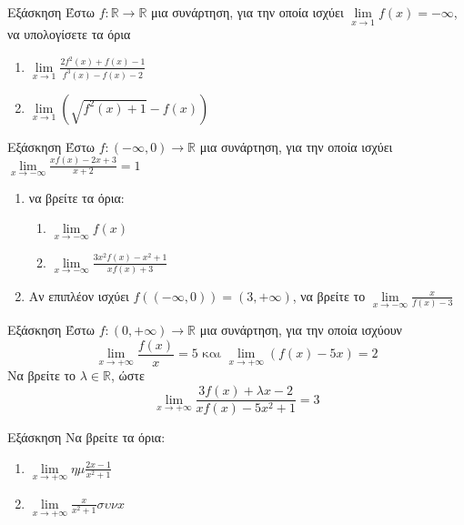 \documentclass[greek]{beamer}
\begin{document}
\begin{frame}{Εξάσκηση}
      Έστω $f:\mathbb{R}\to\mathbb{R}$ μια συνάρτηση, για την οποία ισχύει $\lim\limits_{x \to 1}{ f(x)  }=-\infty$, να υπολογίσετε τα όρια
      \begin{enumerate}
            \item $\lim\limits_{x \to 1}{ \frac{2f^2(x)+f(x)-1}{f^3(x)-f(x)-2} }$ \pause
            \item $\lim\limits_{x \to 1}{ \left( \sqrt{f^2(x)+1}-f(x) \right)  }$
      \end{enumerate}
\end{frame}

\begin{frame}{Εξάσκηση}
      Έστω $f:(-\infty,0)\to\mathbb{R}$ μια συνάρτηση, για την οποία ισχύει $\lim\limits_{x \to -\infty}{ \frac{xf(x)-2x+3}{x+2}  }=1$
      \begin{enumerate}
            \item να βρείτε τα όρια:
                  \begin{enumerate}
                        \item $\lim\limits_{x \to -\infty}{ f(x) }$ \pause
                        \item $\lim\limits_{x \to -\infty}{ \frac{3x^2f(x)-x^2+1}{xf(x)+3}  }$
                  \end{enumerate}
            \item Αν επιπλέον ισχύει $f\left( (-\infty,0) \right)=(3,+\infty) $, να βρείτε το $\lim\limits_{x \to -\infty}{ \frac{x}{f(x)-3} }$
      \end{enumerate}
\end{frame}

\begin{frame}{Εξάσκηση}
      Έστω $f:(0,+\infty)\to\mathbb{R}$ μια συνάρτηση, για την οποία ισχύουν
      $$\lim\limits_{x \to +\infty}{ \frac{f(x)}{x} }=5 \text{ και } \lim\limits_{x \to +\infty}{ (f(x)-5x) }=2$$
      Να βρείτε το $λ\in\mathbb{R}$, ώστε
      $$\lim\limits_{x \to +\infty}{ \frac{3f(x)+λx-2}{xf(x)-5x^2+1} }=3$$
\end{frame}

\begin{frame}{Εξάσκηση}
      Να βρείτε τα όρια:
      \begin{enumerate}
            \item $\lim\limits_{x \to +\infty}{ ημ\frac{2x-1}{x^2+1} }$ \pause
            \item $\lim\limits_{x \to +\infty}{ \frac{x}{x^2+1}συνx  }$
      \end{enumerate}
\end{frame}
\end{document}

